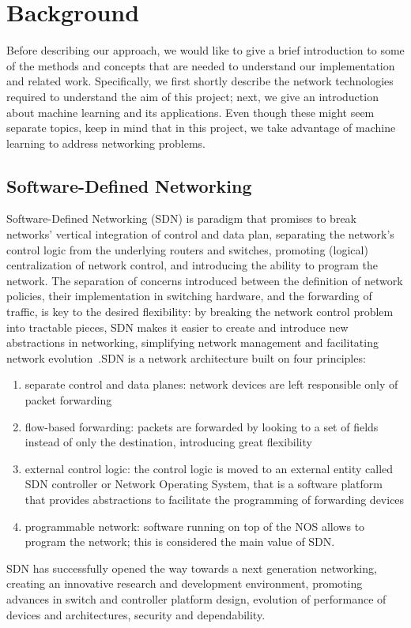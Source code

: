 \chapter{Background}
\label{ch:background}
Before describing our approach, we would like to give a brief introduction to some of the methods and concepts that are needed to understand our implementation and related work. Specifically, we first shortly describe the network technologies required to understand the aim of this project; next, we give an introduction about machine learning and its applications. Even though these might seem separate topics,  keep in mind that in this project, we take advantage of machine learning to address networking problems.

\section{Software-Defined Networking}
Software-Defined Networking (SDN) is paradigm that promises to break networks' vertical integration of control and data plan, separating the network's control logic from the underlying routers and switches, promoting (logical)  centralization  of  network  control,  and  introducing  the ability  to  program  the  network.  The  separation  of  concerns introduced   between   the   definition   of   network   policies,   their implementation  in  switching  hardware,  and  the  forwarding  of traffic, is key to the desired flexibility: by breaking the network control  problem  into  tractable  pieces,  SDN  makes  it  easier  to create and introduce new abstractions in networking, simplifying network  management  and  facilitating  network  evolution~\cite{kreutz2015software}.SDN is a network architecture built on four principles:
\begin{enumerate}
\item separate control and data planes: network devices are left responsible only of packet forwarding
\item flow-based forwarding: packets are forwarded by looking to a set of fields instead of only the destination, introducing great flexibility~\cite{mckeown2008openflow}
\item external control logic: the control logic is moved to an external entity called SDN controller or Network Operating System, that is a software platform that provides abstractions to facilitate the programming of forwarding devices
\item programmable network: software running on top of the NOS allows to program the network; this is considered the main value of SDN.
\end{enumerate}
SDN has successfully opened the way towards a next generation networking, creating an innovative research
and  development  environment,  promoting  advances  in  switch  and  controller platform design,  evolution of performance  of  devices  and  architectures, security and dependability.

